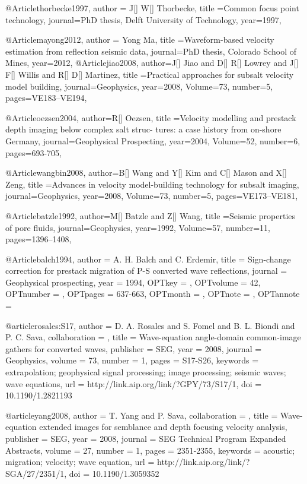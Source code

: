 @Article{thorbecke1997,
  author = {J[] W[] Thorbecke},
  title ={Common focus point technology},
  journal={PhD thesis, Delft University of Technology},
  year=1997,
}

@Article{mayong2012,
  author = {Yong Ma},
  title ={Waveform-based velocity estimation from reflection seismic data},
  journal={PhD thesis, Colorado School of Mines},
  year=2012,
}
@Article{jiao2008,
  author={J[] Jiao and D[] R[] Lowrey and J[] F[] Willis and R[] D[] Martinez},
  title ={Practical approaches for subsalt velocity model building},
  journal={Geophysics},
  year=2008,
  Volume=73,
  number=5,
  pages={VE183–VE194},
}

@Article{oezsen2004,
  author={R[] Oezsen},
  title ={Velocity modelling and prestack depth imaging below complex salt struc-
tures: a case history from on-shore Germany},
  journal={Geophysical Prospecting},
  year=2004,
  Volume=52,
  number=6,
  pages={693-705},
}

@Article{wangbin2008,
  author={B[] Wang and Y[] Kim and C[] Mason and X[] Zeng},
  title ={Advances in velocity model-building technology for subsalt imaging},
  journal={Geophysics},
  year=2008,
  Volume=73,
  number=5,
  pages={VE173–VE181},
}

@Article{batzle1992,
  author={M[] Batzle and Z[] Wang},
  title ={Seismic properties of pore fluids},
  journal={Geophysics},
  year=1992,
  Volume=57,
  number=11,
  pages={1396–1408},
}

@Article{balch1994,
  author = 	 {A. H. Balch and C. Erdemir},
  title = 	 {Sign-change correction for prestack migration of P-S
                  converted wave reflections},
  journal = 	 {Geophysical prospecting},
  year = 	 {1994},
  OPTkey = 	 {},
  OPTvolume = 	 {42},
  OPTnumber = 	 {},
  OPTpages = 	 {637-663},
  OPTmonth = 	 {},
  OPTnote = 	 {},
  OPTannote = 	 {}
}


@article{rosales:S17,
author = {D. A. Rosales and S. Fomel and B. L. Biondi and P. C. Sava},
collaboration = {},
title = {Wave-equation angle-domain common-image gathers for converted waves},
publisher = {SEG},
year = {2008},
journal = {Geophysics},
volume = {73},
number = {1},
pages = {S17-S26},
keywords = {extrapolation; geophysical signal processing; image processing; seismic waves; wave equations},
url = {http://link.aip.org/link/?GPY/73/S17/1},
doi = {10.1190/1.2821193}
}

@article{yang2008,
author = {T. Yang and P. Sava},
collaboration = {},
title = {Wave-equation extended images for semblance and depth focusing velocity analysis},
publisher = {SEG},
year = {2008},
journal = {SEG Technical Program Expanded Abstracts},
volume = {27},
number = {1},
pages = {2351-2355},
keywords = {acoustic; migration; velocity; wave equation},
url = {http://link.aip.org/link/?SGA/27/2351/1},
doi = {10.1190/1.3059352}
}


